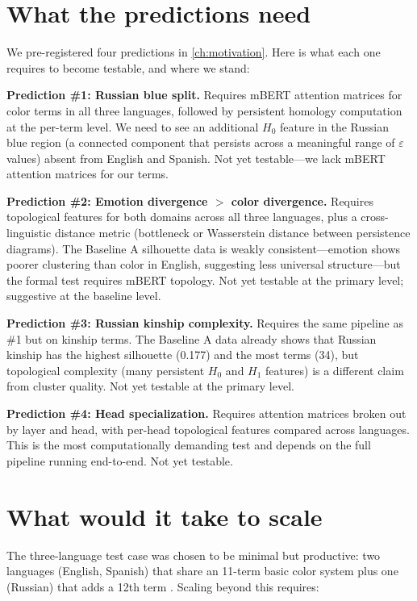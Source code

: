 \section{What the predictions need}

We pre-registered four predictions in \autoref{ch:motivation}. Here is what each one requires to become testable, and where we stand:

\textbf{Prediction \#1: Russian blue split.} Requires mBERT attention matrices for color terms in all three languages, followed by persistent homology computation at the per-term level. We need to see an additional $H_0$ feature in the Russian blue region (a connected component that persists across a meaningful range of $\varepsilon$ values) absent from English and Spanish. Not yet testable---we lack mBERT attention matrices for our terms.

\textbf{Prediction \#2: Emotion divergence $>$ color divergence.} Requires topological features for both domains across all three languages, plus a cross-linguistic distance metric (bottleneck or Wasserstein distance between persistence diagrams). The Baseline A silhouette data is weakly consistent---emotion shows poorer clustering than color in English, suggesting less universal structure---but the formal test requires mBERT topology. Not yet testable at the primary level; suggestive at the baseline level.

\textbf{Prediction \#3: Russian kinship complexity.} Requires the same pipeline as \#1 but on kinship terms. The Baseline A data already shows that Russian kinship has the highest silhouette (0.177) and the most terms (34), but topological complexity (many persistent $H_0$ and $H_1$ features) is a different claim from cluster quality. Not yet testable at the primary level.

\textbf{Prediction \#4: Head specialization.} Requires attention matrices broken out by layer and head, with per-head topological features compared across languages. This is the most computationally demanding test and depends on the full pipeline running end-to-end. Not yet testable.

\section{What would it take to scale}

The three-language test case was chosen to be minimal but productive: two languages (English, Spanish) that share an 11-term basic color system plus one (Russian) that adds a 12th term \parencite{berlin1969, paramei2005, lillo2018}. Scaling beyond this requires:

